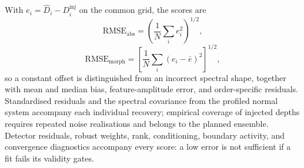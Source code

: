 With $e_i=\widehat D_i-D_i^{\mathrm{inj}}$ on the common grid, the scores
are
\begin{equation}
 \mathrm{RMSE}_{\mathrm{abs}}=
 \left(\frac{1}{N}\sum_i e_i^2\right)^{1/2},
 \label{eq:absolute-rmse}
\end{equation}
\begin{equation}
 \mathrm{RMSE}_{\mathrm{morph}}=
 \left[\frac{1}{N}\sum_i(e_i-\bar e)^2\right]^{1/2},
 \label{eq:morphology-rmse}
\end{equation}
so a constant offset is distinguished from an incorrect spectral shape,
together with mean and median bias, feature-amplitude error, and
order-specific residuals. Standardised residuals and the spectral
covariance from the profiled normal system accompany each individual
recovery; empirical coverage of injected depths requires repeated noise
realisations and belongs to the planned ensemble. Detector residuals,
robust weights, rank, conditioning, boundary activity, and convergence
diagnostics accompany every score: a low error is not sufficient if a fit
fails its validity gates.
